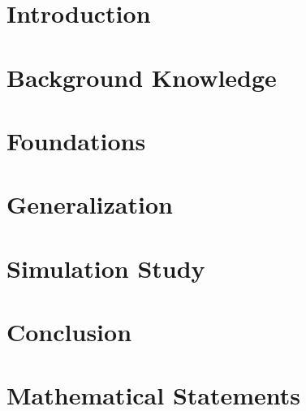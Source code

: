 \documentclass[12pt]{article}
\begin{document}
\newpage
\tableofcontents

\newpage


    
\section{Introduction}
\label{intro}

\newpage

\section{Background Knowledge}
\label{general_definitions}

\newpage
\section{Foundations}
\label{foundations}

\newpage
\section{Generalization}
\label{generalization}

\newpage
\section{Simulation Study}

\label{simulation_study}
\newpage
% 

\section{Conclusion}
\label{conclusion}

\section{Mathematical Statements}
\label{proofs}



\newpage
\end{document}
